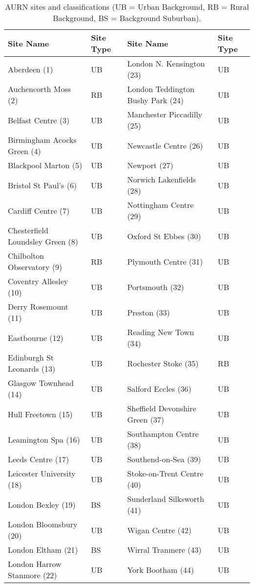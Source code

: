 \documentclass[10pt]{article}
\begin{document}
\begin{table}[!htb]
  \begin{center}
    \begin{tabular}{llll}
    \rowcolor{gray!50}
      \toprule
	\textbf{Site Name} & \textbf{Site Type} & \textbf{Site Name} & \textbf{Site Type} \\
	\midrule
	Aberdeen
 (1) & UB & London N. Kensington
 (23) & UB \\
	Auchencorth Moss (2)
 & RB & London Teddington Bushy Park
 (24) & UB\\
	Belfast Centre
 (3) & UB & Manchester Piccadilly
 (25) & UB \\
	Birmingham Acocks Green (4) & UB & Newcastle Centre
 (26) & UB \\
	Blackpool Marton
 (5)& UB & Newport
 (27) & UB\\
	Bristol St Paul's
 (6)& UB & Norwich Lakenfields
 (28) & UB\\
	Cardiff Centre (7)& UB & Nottingham Centre
 (29) & UB\\
	Chesterfield Loundsley Green
(8) & UB & Oxford St Ebbes
 (30) & UB\\
	Chilbolton Observatory
(9) & RB & Plymouth Centre
 (31) & UB\\
	Coventry Allesley
 (10) & UB & Portsmouth
 (32) & UB\\
	Derry Rosemount
 (11) & UB & Preston
 (33) & UB\\
	Eastbourne
 (12) & UB & Reading New Town
 (34) & UB\\
	Edinburgh St Leonards
 (13) & UB & Rochester Stoke (35) & RB\\
	Glasgow Townhead
 (14) & UB & Salford Eccles
 (36) & UB\\
	Hull Freetown
 (15) & UB & Sheffield Devonshire Green
 (37) & UB\\
	Leamington Spa
 (16) & UB & Southampton Centre
 (38) & UB\\
	Leeds Centre
 (17) & UB & Southend-on-Sea
 (39) & UB\\
	Leicester University
 (18) & UB & Stoke-on-Trent Centre
 (40) & UB\\
	London Bexley (19) & BS & Sunderland Silksworth
 (41) & UB\\
	London Bloomsbury
 (20) & UB & Wigan Centre
 (42) & UB\\
	London Eltham (21) & BS & Wirral Tranmere
 (43) & UB\\
	London Harrow Stanmore
 (22) & UB & York Bootham
 (44) & UB\\
      \bottomrule
    \end{tabular}
    \caption{AURN sites and classifications (UB = Urban Background, RB = Rural Background, BS = Background Suburban).}
    \label{table:AURN_sites}
  \end{center}
\end{table}
\end{document}
